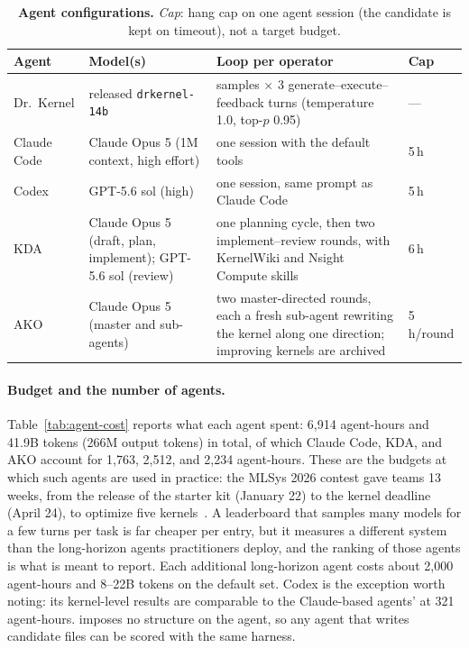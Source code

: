 \begin{table}[H]
  \centering
  \caption{\textbf{Agent configurations.} \emph{Cap}: hang cap on one agent session (the candidate is kept on timeout), not a target budget.}
  \label{tab:agent-config}
  \scriptsize
  \setlength{\tabcolsep}{3pt}
  \begin{tabular}{@{}l>{\raggedright\arraybackslash}p{3.4cm}>{\raggedright\arraybackslash}p{6.2cm}l@{}}
  \toprule
  \textbf{Agent} & \textbf{Model(s)} & \textbf{Loop per operator} & \textbf{Cap} \\
  \midrule
  Dr.~Kernel & released \texttt{drkernel-14b} & 8 samples $\times$ 3 generate--execute--feedback turns (temperature 1.0, top-$p$ 0.95) & --- \\
  Claude Code & Claude Opus 5 (1M context, high effort) & one session with the default tools & 5\,h \\
  Codex & GPT-5.6 sol (high) & one session, same prompt as Claude Code & 5\,h \\
  KDA & Claude Opus 5 (draft, plan, implement); GPT-5.6 sol (review) & one planning cycle, then two implement--review rounds, with KernelWiki and Nsight Compute skills & 6\,h \\
  AKO & Claude Opus 5 (master and sub-agents) & two master-directed rounds, each a fresh sub-agent rewriting the kernel along one direction; improving kernels are archived & 5\,h/round \\
  \bottomrule
  \end{tabular}
\end{table}

\paragraph{Budget and the number of agents.}
Table~\ref{tab:agent-cost} reports what each agent spent: 6{,}914 agent-hours and 41.9B tokens (266M output tokens) in total, of which Claude Code, KDA, and AKO account for 1{,}763, 2{,}512, and 2{,}234 agent-hours.
These are the budgets at which such agents are used in practice: the MLSys 2026 contest gave teams 13 weeks, from the release of the starter kit (January 22) to the kernel deadline (April 24), to optimize five kernels~\citep{mlsys26contest}.
A leaderboard that samples many models for a few turns per task is far cheaper per entry, but it measures a different system than the long-horizon agents practitioners deploy, and the ranking of those agents is what \fastkernels{} is meant to report.
Each additional long-horizon agent costs about 2{,}000 agent-hours and 8--22B tokens on the default set.
Codex is the exception worth noting: its kernel-level results are comparable to the Claude-based agents' at 321 agent-hours.
\fastkernels{} imposes no structure on the agent, so any agent that writes candidate files can be scored with the same harness.

